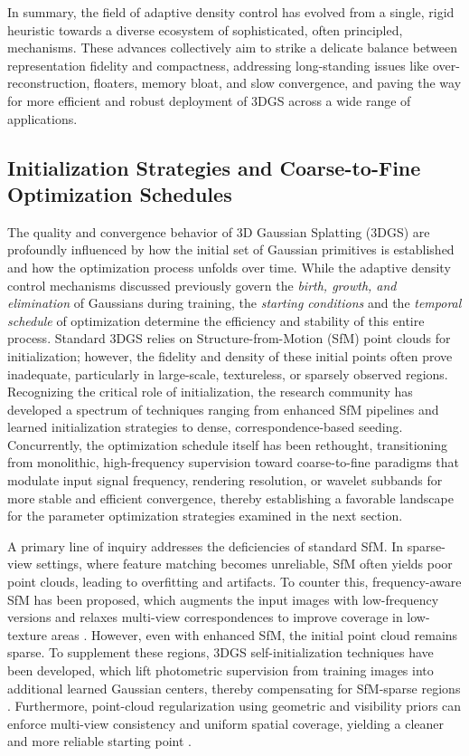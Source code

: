 \documentclass[11pt]{article}
\begin{document}
In summary, the field of adaptive density control has evolved from a single, rigid heuristic towards a diverse ecosystem of sophisticated, often principled, mechanisms. These advances collectively aim to strike a delicate balance between representation fidelity and compactness, addressing long-standing issues like over-reconstruction, floaters, memory bloat, and slow convergence, and paving the way for more efficient and robust deployment of 3DGS across a wide range of applications.

\subsection{Initialization Strategies and Coarse-to-Fine Optimization Schedules}

The quality and convergence behavior of 3D Gaussian Splatting (3DGS) are profoundly influenced by how the initial set of Gaussian primitives is established and how the optimization process unfolds over time. While the adaptive density control mechanisms discussed previously govern the \emph{birth, growth, and elimination} of Gaussians during training, the \emph{starting conditions} and the \emph{temporal schedule} of optimization determine the efficiency and stability of this entire process. Standard 3DGS relies on Structure-from-Motion (SfM) point clouds for initialization; however, the fidelity and density of these initial points often prove inadequate, particularly in large-scale, textureless, or sparsely observed regions. Recognizing the critical role of initialization, the research community has developed a spectrum of techniques ranging from enhanced SfM pipelines and learned initialization strategies to dense, correspondence-based seeding. Concurrently, the optimization schedule itself has been rethought, transitioning from monolithic, high-frequency supervision toward coarse-to-fine paradigms that modulate input signal frequency, rendering resolution, or wavelet subbands for more stable and efficient convergence, thereby establishing a favorable landscape for the parameter optimization strategies examined in the next section.

A primary line of inquiry addresses the deficiencies of standard SfM. In sparse-view settings, where feature matching becomes unreliable, SfM often yields poor point clouds, leading to overfitting and artifacts. To counter this, frequency-aware SfM has been proposed, which augments the input images with low-frequency versions and relaxes multi-view correspondences to improve coverage in low-texture areas \cite{ref137}. However, even with enhanced SfM, the initial point cloud remains sparse. To supplement these regions, 3DGS self-initialization techniques have been developed, which lift photometric supervision from training images into additional learned Gaussian centers, thereby compensating for SfM-sparse regions \cite{ref137}. Furthermore, point-cloud regularization using geometric and visibility priors can enforce multi-view consistency and uniform spatial coverage, yielding a cleaner and more reliable starting point \cite{ref137}.
\end{document}
